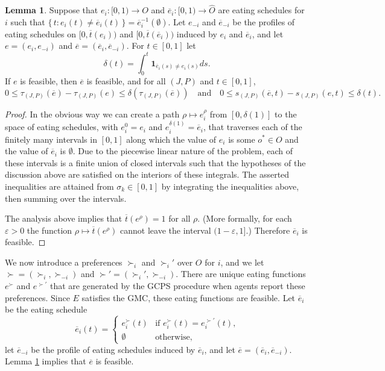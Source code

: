 \documentclass[12pt, A4paper]{article}
\theoremstyle{definition}
\newtheorem{lem}{Lemma}
\newcommand{\hO}{{\hat O}}
\newcommand{\bare}{\overline{e}}
\newcommand{\bart}{{\overline t}}
\newcommand{\varep}{\varepsilon}
\newcommand{\bone}{\mathbf{1}}
\begin{document}
\begin{appendix}
  
\begin{lem} \label{lemma:FeasibleNew}
  Suppose that $e_i \colon [0,1) \to O$ and $\bare_i \colon [0,1) \to \hO$ are eating schedules for $i$ such that $\{\, t : e_i(t) \ne \bare_i(t) \,\} = \bare_i^{-1}(\emptyset)$.  Let $e_{-i}$ and $\bare_{-i}$ be the profiles of eating schedules on $[0,\bart(e_i))$ and $[0,\bart(\bare_i))$ induced by $e_i$ and $\bare_i$, and let $e = (e_i,e_{-i})$ and $\bare = (\bare_i,\bare_{-i})$.  For $t \in [0,1]$ let
  $$\delta(t) = \int_0^t \bone_{\bare_i(s) \ne e_i(s)} ds.$$
  If $e$ is feasible, then $\bare$ is feasible, and for all $(J,P)$ and $t \in [0,1]$, 
  $$0 \le \tau_{(J,P)}(\bare) - \tau_{(J,P)}(e) \le \delta(\tau_{(J,P)}(\bare)) \quad \text{and} \quad 0 \le s_{(J,P)}(\bare,t) - s_{(J,P)}(e,t)  \le \delta(t).$$
\end{lem}

\begin{proof}
  In the obvious way we can create a path $\rho \mapsto e_i^\rho$ from $[0,\delta(1)]$ to the space of eating schedules, with $e_i^0 = e_i$ and $e_i^{\delta(1)} = \bare_i$, that traverses each of the finitely many intervals in $[0,1]$ along which the value of $e_i$ is some $o^* \in O$ and the value of $\bare_i$ is $\emptyset$. Due to the piecewise linear nature of the problem, each of these intervals is a finite union of closed intervals such that the hypotheses of the discussion above are satisfied on the interiors of these integrals.  
  The asserted inequalities are attained from $\sigma_k \in [0,1]$ by integrating the inequalities above, then summing over the intervals. 
  
  The 
  analysis above implies that $\bart(e^\rho) = 1$ for all $\rho$.  
  (More formally, for each $\varep > 0$ the function 
  $\rho \mapsto \bart(e^\rho)$ cannot leave the interval $(1 - \varep,1]$.)  Therefore $\bare_i$ is feasible.
\end{proof}

We now introduce a preferences $\succ_i$ and  $\succ_i'$ over $O$ for $i$, and we let $\succ = (\succ_i,\succ_{-i})$ and $\succ' = (\succ_i',\succ_{-i})$.  There are unique eating functions $e^\succ$ and  $e^{\succ'}$ that are  generated by the GCPS procedure when agents report these preferences.  Since $E$ satisfies the GMC, these eating functions are feasible.
Let $\bare_i$ be the eating schedule
$$\bare_i(t) = 
\begin{cases}
  e_i^\succ(t) & \text{if $e_i^\succ(t) = e_i^{\succ'}(t)$,} \\
  \emptyset & \text{otherwise},
\end{cases}$$
let $\bare_{-i}$ be the profile of eating schedules induced by $\bare_i$, and let $\bare = (\bare_i,\bare_{-i})$.  Lemma \ref{lemma:FeasibleNew} implies that $\bare$ is feasible.


\end{appendix}
\end{document}
